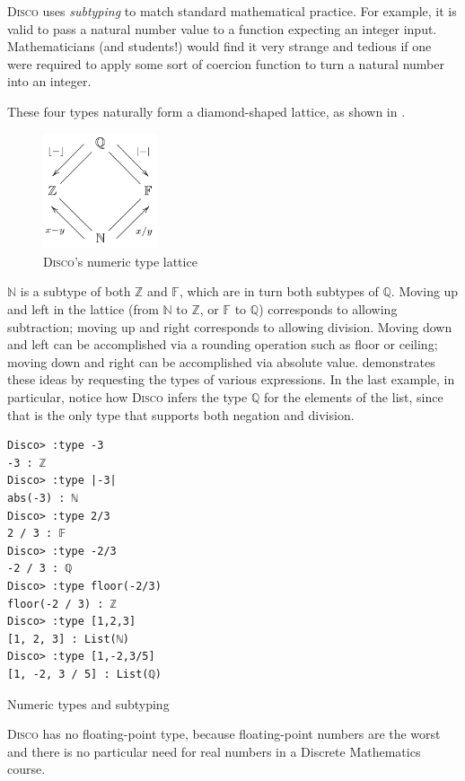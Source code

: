 \documentclass[submission,copyright,creativecommons]{eptcs}
\newcommand{\disco}{\textsc{Disco}\xspace}
\newcommand{\pref}[1]{\prettyref{#1}}
\newcommand{\N}{\mathbb{N}}
\newcommand{\Z}{\mathbb{Z}}
\newcommand{\F}{\mathbb{F}}
\newcommand{\Q}{\mathbb{Q}}
\begin{document}
\disco uses \emph{subtyping} to match standard mathematical practice.
For example, it is valid to pass a natural number value to a function
expecting an integer input.  Mathematicians (and students!) would find
it very strange and tedious if one were required to apply some sort of
coercion function to turn a natural number into an integer.

These four types naturally form a diamond-shaped lattice, as shown in
\pref{fig:lattice}.
\begin{figure}[htp]
  \centering
  \includegraphics[width=0.3\textwidth]{../../docs/images/diamond.png}
  \caption{\disco's numeric type lattice}
  \label{fig:lattice}
\end{figure}
$\N$ is a subtype of both $\Z$ and $\F$, which are in turn both
subtypes of $\Q$.  Moving up and left in the lattice (from $\N$ to
$\Z$, or $\F$ to $\Q$) corresponds to allowing subtraction; moving up
and right corresponds to allowing division.  Moving down and left can
be accomplished via a rounding operation such as floor or ceiling;
moving down and right can be accomplished via absolute
value. \pref{lst:subtype} demonstrates these ideas by requesting the
types of various expressions.  In the last example, in particular,
notice how \disco infers the type $\Q$ for the elements of the list,
since that is the only type that supports both negation and division.
\begin{listing}
\begin{verbatim}
Disco> :type -3
-3 : ℤ
Disco> :type |-3|
abs(-3) : ℕ
Disco> :type 2/3
2 / 3 : 𝔽
Disco> :type -2/3
-2 / 3 : ℚ
Disco> :type floor(-2/3)
floor(-2 / 3) : ℤ
Disco> :type [1,2,3]
[1, 2, 3] : List(ℕ)
Disco> :type [1,-2,3/5]
[1, -2, 3 / 5] : List(ℚ)
\end{verbatim}
\caption{Numeric types and subtyping}
\label{lst:subtype}
\end{listing}

\disco has no floating-point type, because floating-point numbers are
the worst \cite{goldberg1991every} and there is no particular need for real numbers
in a Discrete Mathematics course.
\end{document}
